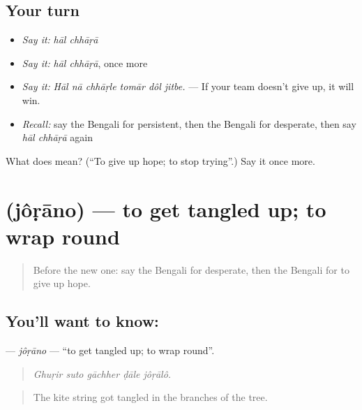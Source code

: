 \subsection*{Your turn}
\begin{itemize}
\raggedright
  \item \emph{Say it:} \emph{hāl chhāṛā}
  \item \emph{Say it:} \emph{hāl chhāṛā}, once more
  \item \emph{Say it:} \emph{Hāl nā chhāṛle tomār dôl jitbe.} — If your team doesn't give up, it will win.
  \item \emph{Recall:} say the Bengali for persistent, then the Bengali for desperate, then say \emph{hāl chhāṛā} again
\end{itemize}

\begin{tcolorbox}[breakable,colback=teal!4,colframe=teal!35!black,title={Before you move on}]
What does   mean? (\textquotedblleft{}To give up hope; to stop trying\textquotedblright{}.) Say it once more.
\end{tcolorbox}
\section[\texorpdfstring{\bn{জড়ানো} (jôṛāno)}{জড়ানো (jôṛāno)}]{ (jôṛāno) — to get tangled up; to wrap round}

\label{lesson:BN-C539-jorano}



\begin{quote}
Before the new one: say the Bengali for desperate, then the Bengali for to give up hope.
\end{quote}

\subsection*{You'll want to know: }
\textbf{} — \emph{jôṛāno} — \textquotedblleft{}to get tangled up; to wrap round\textquotedblright{}.

\begin{quote}
    
\end{quote}

\begin{quote}
\emph{Ghuṛir suto gāchher ḍāle jôṛālô.}
\end{quote}

\begin{quote}
The kite string got tangled in the branches of the tree.
\end{quote}

